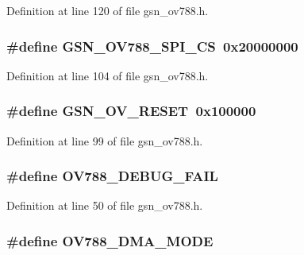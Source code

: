 Definition at line 120 of file gsn\_\-ov788.h.

\hypertarget{a00537_a4453254e3a83038e9b0c9166e37a2afd}{
\subsubsection[{GSN\_\-OV788\_\-SPI\_\-CS}]{\setlength{\rightskip}{0pt plus 5cm}\#define GSN\_\-OV788\_\-SPI\_\-CS~0x20000000}}
\label{a00537_a4453254e3a83038e9b0c9166e37a2afd}


Definition at line 104 of file gsn\_\-ov788.h.

\hypertarget{a00537_ace8e0326ad3e1b1b382dde589ab73c5d}{
\subsubsection[{GSN\_\-OV\_\-RESET}]{\setlength{\rightskip}{0pt plus 5cm}\#define GSN\_\-OV\_\-RESET~0x100000}}
\label{a00537_ace8e0326ad3e1b1b382dde589ab73c5d}


Definition at line 99 of file gsn\_\-ov788.h.

\hypertarget{a00537_a81f4980cc3162540e05310924e7a8d09}{
\subsubsection[{OV788\_\-DEBUG\_\-FAIL}]{\setlength{\rightskip}{0pt plus 5cm}\#define OV788\_\-DEBUG\_\-FAIL}}
\label{a00537_a81f4980cc3162540e05310924e7a8d09}


Definition at line 50 of file gsn\_\-ov788.h.

\hypertarget{a00537_a31d384363afc62e31bcc256be1630044}{
\subsubsection[{OV788\_\-DMA\_\-MODE}]{\setlength{\rightskip}{0pt plus 5cm}\#define OV788\_\-DMA\_\-MODE}}
\label{a00537_a31d384363afc62e31bcc256be1630044}


